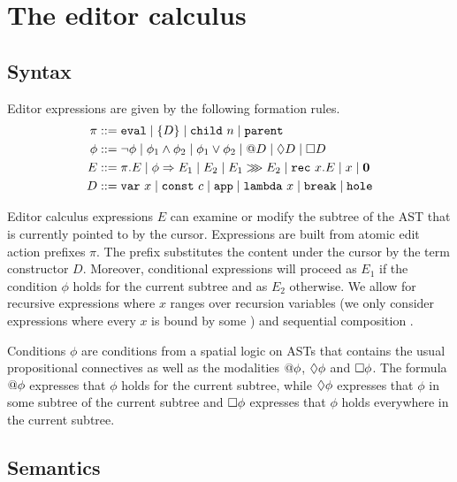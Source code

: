 \section{The editor calculus}

\subsection{Syntax}

Editor expressions are given by the following formation rules.
%
\begin{align}
    \pi &::= \texttt{eval}
  \mid \{ D \}
  \mid \texttt{child}~n
  \mid \texttt{parent} \label{aep-formation-rules} \\
   \phi &::= \neg\phi
  \mid \phi_1 \land \phi_2
  \mid \phi_1 \lor \phi_2
  \mid @D
  \mid \Diamond D
  \mid \Box D \label{eed-formation-rules} \\
    E &::= \pi.E
  \mid \phi \Rightarrow E_1 \mid E_2
  \mid E_1 \ggg E_2
  \mid \texttt{rec}~x.E
  \mid x
  \mid \mathbf{0} \label{edt-formation-rules} \\
    D &::= \texttt{var}~x
  \mid \texttt{const}~c
  \mid \texttt{app}
  \mid \texttt{lambda}~x
  \mid \texttt{break}
  \mid \texttt{hole} \label{aam-formation-rules}
\end{align}

Editor calculus expressions $E$ can examine or modify the subtree of the
AST that is currently pointed to by the cursor. Expressions are built
from atomic edit action prefixes $\pi$. The  prefix substitutes
the content under the cursor by the term constructor $D$. Moreover,
conditional expressions  will proceed as $E_1$
if the condition $\phi$ holds for the current subtree and as $E_2$
otherwise. We allow for recursive expressions  where $x$
ranges over recursion variables (we only consider expressions where
every $x$ is bound by some ) and sequential composition
.

Conditions $\phi$ are conditions from a spatial logic on ASTs that contains
the usual propositional connectives as well as the modalities
$@\phi$, $\Diamond \phi$ and $\Box \phi$. The formula
$@\phi$ expresses that $\phi$ holds for the current subtree, while
$\Diamond \phi$ expresses that $\phi$ in some subtree of the current
subtree and $\Box \phi$ expresses that $\phi$ holds
everywhere in the current subtree.

\subsection{Semantics}

